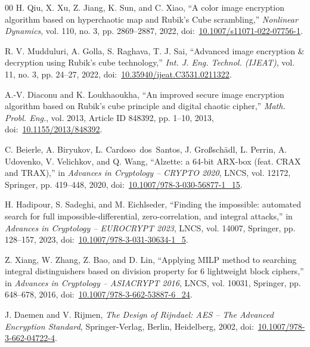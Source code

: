 \documentclass[10pt,twocolumn]{article}
\begin{document}
\begin{thebibliography}{00}
H. Qiu, X. Xu, Z. Jiang, K. Sun, and C. Xiao, ``A color image encryption algorithm based on hyperchaotic map and Rubik's Cube scrambling,'' \textit{Nonlinear Dynamics}, vol. 110, no. 3, pp. 2869--2887, 2022, doi:~\href{https://doi.org/10.1007/s11071-022-07756-1}{10.1007/s11071-022-07756-1}.

R. V. Mudduluri, A. Golla, S. Raghava, T. J. Sai, ``Advanced image encryption \& decryption using Rubik's cube technology,'' \textit{Int. J. Eng. Technol. (IJEAT)}, vol. 11, no. 3, pp. 24--27, 2022, doi:~\href{https://doi.org/10.35940/ijeat.C3531.0211322}{10.35940/ijeat.C3531.0211322}.

A.-V. Diaconu and K. Loukhaoukha, ``An improved secure image encryption algorithm based on Rubik's cube principle and digital chaotic cipher,'' \textit{Math. Probl. Eng.}, vol. 2013, Article ID 848392, pp. 1--10, 2013, doi:~\href{https://doi.org/10.1155/2013/848392}{10.1155/2013/848392}.

C. Beierle, A. Biryukov, L. Cardoso~dos~Santos, J. Gro{\ss}sch\"{a}dl, L. Perrin, A. Udovenko, V. Velichkov, and Q. Wang, ``Alzette: a 64-bit ARX-box (feat. CRAX and TRAX),'' in \textit{Advances in Cryptology -- CRYPTO 2020}, LNCS, vol. 12172, Springer, pp. 419--448, 2020, doi:~\href{https://doi.org/10.1007/978-3-030-56877-1_15}{10.1007/978-3-030-56877-1\_15}.

H. Hadipour, S. Sadeghi, and M. Eichlseder, ``Finding the impossible: automated search for full impossible-differential, zero-correlation, and integral attacks,'' in \textit{Advances in Cryptology -- EUROCRYPT 2023}, LNCS, vol. 14007, Springer, pp. 128--157, 2023, doi:~\href{https://doi.org/10.1007/978-3-031-30634-1_5}{10.1007/978-3-031-30634-1\_5}.

Z. Xiang, W. Zhang, Z. Bao, and D. Lin, ``Applying MILP method to searching integral distinguishers based on division property for 6 lightweight block ciphers,'' in \textit{Advances in Cryptology -- ASIACRYPT 2016}, LNCS, vol. 10031, Springer, pp. 648--678, 2016, doi:~\href{https://doi.org/10.1007/978-3-662-53887-6_24}{10.1007/978-3-662-53887-6\_24}.

J. Daemen and V. Rijmen, \textit{The Design of Rijndael: AES -- The Advanced Encryption Standard}, Springer-Verlag, Berlin, Heidelberg, 2002, doi:~\href{https://doi.org/10.1007/978-3-662-04722-4}{10.1007/978-3-662-04722-4}.


\end{thebibliography}
\end{document}

